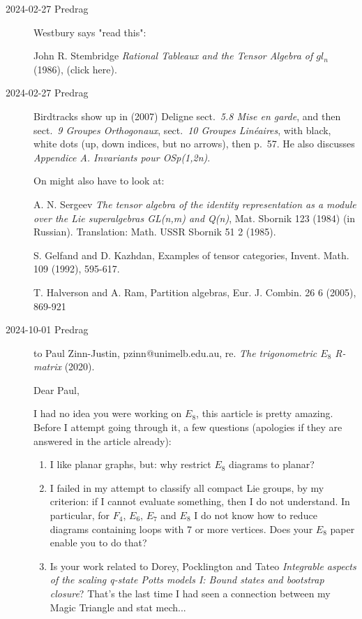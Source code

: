 \begin{description}
\item[2024-02-27 Predrag] Westbury says "read this":

John R. Stembridge
{\em Rational Tableaux and the Tensor Algebra of $gl_n$} (1986),
 {(click here)}.

\item[2024-02-27 Predrag] Birdtracks show up in (2007)
Deligne sect.~{\em 5.8 Mise en garde}, and
then sect.~{\em 9 Groupes Orthogonaux},
sect.~{\em 10 Groupes Lin\'eaires}, with black, white dots (up, down indices,
but no arrows), then p.~57. He also discusses
{\em Appendice A. Invariants pour OSp(1,2n)}.

On might also have to look at:

A. N. Sergeev {\em The tensor algebra of the identity representation as a
module over the Lie superalgebras GL(n,m) and Q(n)}, Mat. Sbornik
123 (1984) (in Russian). Translation: Math. USSR Sbornik 51 2
(1985).

S. Gelfand and D. Kazhdan, Examples of tensor categories, Invent.
Math. 109 (1992), 595-617.

T. Halverson and A. Ram, Partition algebras, Eur. J. Combin. 26 6
(2005), 869-921

\item[2024-10-01 Predrag] to 
{Paul Zinn-Justin}, pzinn@unimelb.edu.au,
re. {\em The trigonometric {$E_8$} {R}-matrix} (2020).

Dear Paul,

I had no idea you were working on $E_8$, this aarticle is pretty amazing.
Before I attempt going through it, a few questions (apologies if they are answered in 
the article already):

\begin{enumerate}
  \item 
I like planar graphs, but: why restrict  $E_8$ diagrams to planar?
  \item
I failed in my attempt to classify all compact Lie groups, by my 
criterion: if I cannot evaluate something, then I do not understand. In 
particular, for $F_4$, $E_6$,  $E_7$ and $E_8$ I do not know how to 
reduce diagrams containing loops with 7 or more vertices. Does your $E_8$ 
paper enable you to do that? 
  \item Is your work related to
 Dorey, Pocklington and Tateo 
{\em Integrable aspects of the scaling q-state Potts models I:
    Bound states and bootstrap closure}? That's the last time I had 
seen a connection between my Magic Triangle and stat mech...
\end{enumerate}


\end{description}
